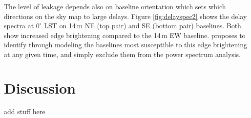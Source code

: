 \documentclass{emulateapj}
\begin{document}
The level of leakage depends also on baseline orientation which sets which directions on the sky map to large delays. Figure \ref{fig:delayspec2} shows the delay spectra at $0^\circ$ LST on 14\,m NE (top pair) and SE (bottom pair) baselines. Both show increased edge brightening compared to the 14\,m EW baseline. \citet{nithya15} proposes to identify through modeling the baselines most susceptible to this edge brightening at any given time, and simply exclude them from the power spectrum analysis. 









\section{Discussion}

add stuff here







\end{document}
